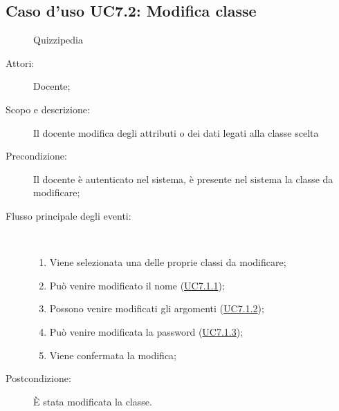 \subsection{Caso d'uso UC7.2: Modifica classe}
	\begin{figure}[H]
		\centering
		\begin{resizedtikzpicture}{\textwidth}
		\begin{umlsystem}[x=0, fill=lightgray!20]{Quizzipedia}
		\end{umlsystem}
		\end{resizedtikzpicture}
		\caption{}
	\end{figure}
\begin{description}
\item[Attori:] Docente;
\item[Scopo e descrizione:] Il docente modifica degli attributi o dei dati legati alla classe scelta
      \item[Precondizione:] Il docente è autenticato nel sistema, è presente nel sistema la classe da modificare;

        \item[Flusso principale degli eventi:] \ 
 \begin{enumerate}
          \item Viene selezionata una delle proprie classi da modificare;
          \item Può venire modificato il nome (\hyperlink{UC7.1.1}{UC7.1.1});
          \item Possono venire modificati gli argomenti (\hyperlink{UC7.1.2}{UC7.1.2});
          \item Può venire modificata la password (\hyperlink{UC7.1.3}{UC7.1.3});
          \item Viene confermata la modifica;

      \end{enumerate}
    \item[Postcondizione:] È stata modificata la classe.
  \end{description}
\hypertarget{UC7.3}{}

